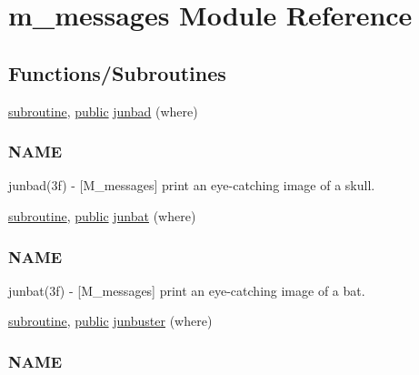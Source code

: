 \hypertarget{namespacem__messages}{}\section{m\+\_\+messages Module Reference}
\label{namespacem__messages}
\subsection*{Functions/\+Subroutines}
\begin{DoxyCompactItemize}
\item 
\hyperlink{M__stopwatch_83_8txt_acfbcff50169d691ff02d4a123ed70482}{subroutine}, \hyperlink{M__stopwatch_83_8txt_a2f74811300c361e53b430611a7d1769f}{public} \hyperlink{namespacem__messages_acad2630aef5050e3cfda550f22141f3c}{junbad} (where)
\begin{DoxyCompactList}\small\item\em \subsubsection*{N\+A\+ME}

junbad(3f) -\/ \mbox{[}M\+\_\+messages\mbox{]} print an eye-\/catching image of a skull. \end{DoxyCompactList}\item 
\hyperlink{M__stopwatch_83_8txt_acfbcff50169d691ff02d4a123ed70482}{subroutine}, \hyperlink{M__stopwatch_83_8txt_a2f74811300c361e53b430611a7d1769f}{public} \hyperlink{namespacem__messages_aa7fb6e6a0f67d0456ac5aee78d81213d}{junbat} (where)
\begin{DoxyCompactList}\small\item\em \subsubsection*{N\+A\+ME}

junbat(3f) -\/ \mbox{[}M\+\_\+messages\mbox{]} print an eye-\/catching image of a bat. \end{DoxyCompactList}\item 
\hyperlink{M__stopwatch_83_8txt_acfbcff50169d691ff02d4a123ed70482}{subroutine}, \hyperlink{M__stopwatch_83_8txt_a2f74811300c361e53b430611a7d1769f}{public} \hyperlink{namespacem__messages_a8d5bfbeee271ab7e419dc9960caf5221}{junbuster} (where)
\begin{DoxyCompactList}\small\item\em \subsubsection*{N\+A\+ME}


\end{DoxyCompactList}
\end{DoxyCompactItemize}

